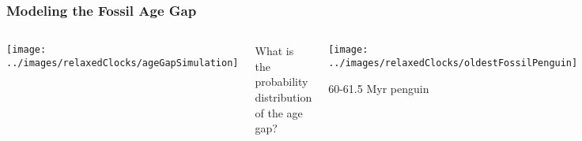 \begin{frame}
\frametitle{Modeling the Fossil Age Gap}

\begin{columns}


\texttt{[image: ../images/relaxedClocks/ageGapSimulation]}

\small{What is the probability distribution of the age gap?}


\begin{centering}

\texttt{[image: ../images/relaxedClocks/oldestFossilPenguin]}

\large{60-61.5 Myr penguin}

\end{centering}

\medskip{}

\scriptsize{Current day penguin species: 20}

\medskip{}

\scriptsize{Number of independent penguin fossils with good geological age from all ages: 20-60}

\end{columns}


\end{frame}
